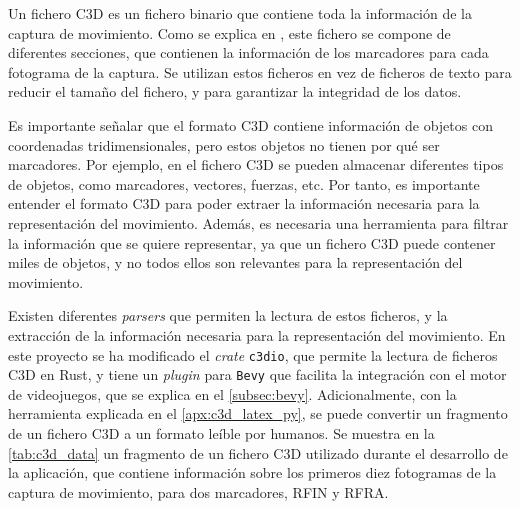Un fichero \ac{C3D} es un fichero binario que contiene toda la información de la captura de movimiento. Como se explica en \autocite{C3DORGBiomechanicsStandard}, este fichero se compone de diferentes secciones, que contienen la información de los marcadores para cada fotograma de la captura. Se utilizan estos ficheros en vez de ficheros de texto para reducir el tamaño del fichero, y para garantizar la integridad de los datos.

Es importante señalar que el formato \ac{C3D} contiene información de objetos con coordenadas tridimensionales, pero estos objetos no tienen por qué ser marcadores. Por ejemplo, en el fichero \ac{C3D} se pueden almacenar diferentes tipos de objetos, como marcadores, vectores, fuerzas, etc. Por tanto, es importante entender el formato \ac{C3D} para poder extraer la información necesaria para la representación del movimiento. Además, es necesaria una herramienta para filtrar la información que se quiere representar, ya que un fichero \ac{C3D} puede contener miles de objetos, y no todos ellos son relevantes para la representación del movimiento.

Existen diferentes \textit{parsers} que permiten la lectura de estos ficheros, y la extracción de la información necesaria para la representación del movimiento. En este proyecto se ha modificado el \textit{crate} \texttt{c3dio}, que permite la lectura de ficheros \ac{C3D} en Rust, y tiene un \textit{plugin} para \texttt{Bevy} que facilita la integración con el motor de videojuegos, que se explica en el \autoref{subsec:bevy}. Adicionalmente, con la herramienta explicada en el \autoref{apx:c3d_latex_py}, se puede convertir un fragmento de un fichero \ac{C3D} a un formato leíble por humanos. Se muestra en la \autoref{tab:c3d_data} un fragmento de un fichero \ac{C3D} utilizado durante el desarrollo de la aplicación, que contiene información sobre los primeros diez fotogramas de la captura de movimiento, para dos marcadores, \ac{RFIN} y \ac{RFRA}.

